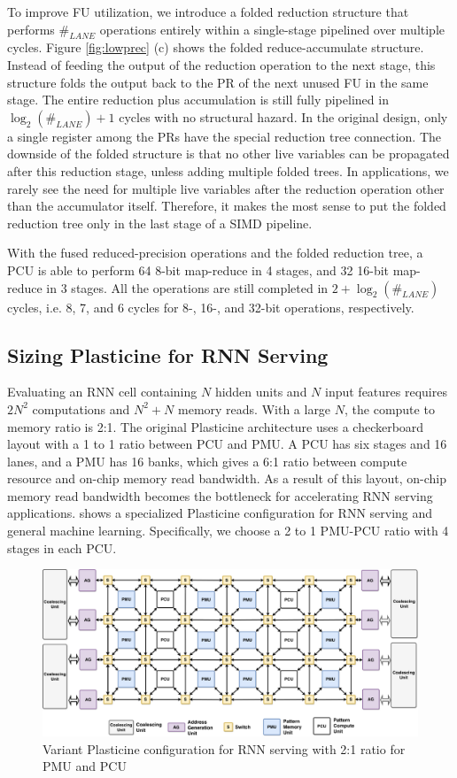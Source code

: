 To improve FU utilization, we introduce a folded reduction structure that performs $\#_{LANE}$
operations entirely within a single-stage pipelined over multiple cycles.
Figure \ref{fig:lowprec} (c) shows the folded reduce-accumulate structure.
Instead of feeding the output of the reduction operation to the next stage, 
this structure folds the output back to the PR of the next unused FU in the same stage. 
The entire reduction plus accumulation is still fully pipelined in $\log_2(\#_{LANE})+1$ cycles
with no structural hazard.
In the original design, only a single register among the PRs have the special reduction tree
connection.
The downside of the folded structure is that no other live variables can be propagated after this
reduction stage, unless adding multiple folded trees. 
In applications, we rarely see the need for multiple live variables after the reduction operation
other than the accumulator itself.
Therefore, it makes the most sense to put the
folded reduction tree only in the last stage of a SIMD pipeline.

With the fused reduced-precision operations and the folded reduction tree,
  a PCU is able to perform 64 8-bit map-reduce in 4 stages, and 32 16-bit map-reduce in 3 stages.
All the operations are still completed in $2+\log_2(\#_{LANE})$ cycles, i.e. 
8, 7, and 6 cycles for 8-, 16-, and 32-bit operations, respectively.

\subsection{Sizing Plasticine for RNN Serving} \label{sec:sizing}
Evaluating an RNN cell containing $N$ hidden units and $N$ input features
  requires $2N^2$ computations and $N^2+N$ memory reads.
With a large $N$, the compute to memory ratio is 2:1.
The original Plasticine architecture uses a checkerboard layout
  with a 1 to 1 ratio between PCU and PMU.
A PCU has six stages and 16 lanes, and a PMU has 16 banks, which gives a 6:1 ratio between
  compute resource and on-chip memory read bandwidth.
As a result of this layout,
  on-chip memory read bandwidth becomes the bottleneck for accelerating RNN serving applications.
 shows a specialized Plasticine configuration for RNN serving and general machine
learning.
Specifically, we choose a 2 to 1 PMU-PCU ratio with 4 stages in each PCU.
\begin{figure}
  \centering
  \includegraphics[width=\textwidth]{figs/rnnarch.pdf}
  \caption[Variant Plasticine configuration for RNN serving]{
    Variant Plasticine configuration for RNN serving with 2:1 ratio for PMU and PCU}
  \label{fig:rnnarch}
\end{figure}
